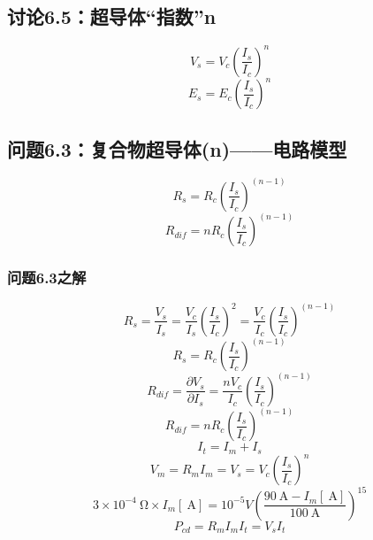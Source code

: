 \subsection{讨论6.5：超导体“指数”n}
\begin{equation}%
V_s=V_c(\frac{I_s}{I_c})^n
\end{equation}
\begin{equation}%
E_s=E_c(\frac{I_s}{I_c})^n
\end{equation}



\subsection{问题6.3：复合物超导体(n)——电路模型}
\begin{equation}%
R_s=R_c(\frac{I_s}{I_c})^{(n-1)}
\end{equation}
\begin{equation}%
R_{dif}=nR_c(\frac{I_s}{I_c})^{(n-1)}
\end{equation}

\subsubsection{问题6.3之解}

\begin{equation}%
R_s=\frac{V_s}{I_s}=\frac{V_c}{I_s}(\frac{I_s}{I_c})^2=\frac{V_c}{I_c}(\frac{I_s}{I_c})^{(n-1)}
\end{equation}
\begin{equation}%
R_s=R_c(\frac{I_s}{I_c})^{(n-1)}
\end{equation}
\begin{equation}%
R_{dif}=\frac{\partial V_s}{\partial I_s}=\frac{nV_c}{I_c}(\frac{I_s}{I_c})^{(n-1)}
\end{equation}
\begin{equation}%
R_{dif}=nR_c(\frac{I_s}{I_c})^{(n-1)}
\end{equation}
\begin{equation}%
I_t=I_m+I_s
\end{equation}
\begin{equation}%
V_m=R_mI_m=V_s=V_c(\frac{I_s}{I_c})^{n}
\end{equation}
\begin{equation}%
3\times 10^{-4}\ \mathrm{\Omega}\times I_m[\ \mathrm{A}]=10^{-5}V(\frac{90\ \mathrm{A}-I_m[\ \mathrm{A}]}{100\ \mathrm{A}})^{15}
\end{equation}
\begin{equation}%
P_{cd}=R_mI_mI_t=V_sI_t
\end{equation}



